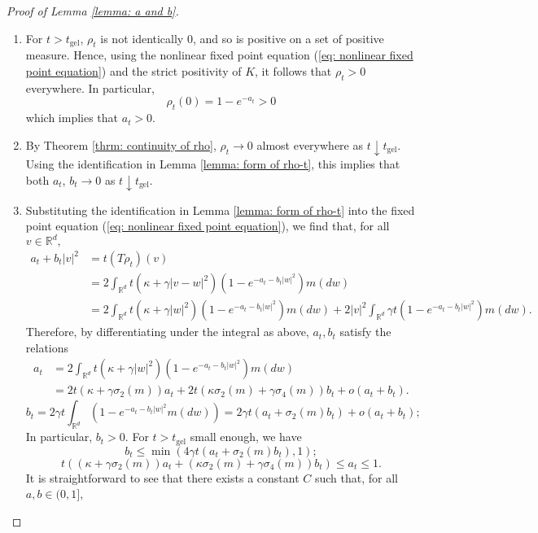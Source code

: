 \begin{proof}[Proof of Lemma \ref{lemma: a and b}] \begin{enumerate}[label=\roman{*}).]
    \item For $t>t_\text{gel}$, $\rho_t$ is not identically $0$, and so is positive on a set of positive measure. Hence, using the nonlinear fixed point equation (\ref{eq: nonlinear fixed point equation}) and the strict positivity of $K$, it follows that $\rho_t>0$ everywhere. In particular, \begin{equation}
        \rho_t(0)=1-e^{-a_t}>0
    \end{equation} which implies that $a_t>0.$
    \item By Theorem \ref{thrm: continuity of rho},  $\rho_t\rightarrow 0$ almost everywhere as $t\downarrow t_\text{gel}$. Using the identification in Lemma \ref{lemma: form of rho-t}, this implies that both $a_t$, $b_t \rightarrow 0$ as $t\downarrow t_\text{gel}$.
    \item Substituting the identification in Lemma \ref{lemma: form of rho-t} into the fixed point equation (\ref{eq: nonlinear fixed point equation}), we find that, for all $v\in \mathbb{R}^d,$ \begin{equation}\begin{split} a_t+b_t|v|^2 &= t(T\rho_t)(v)\\ & =2\int_{\mathbb{R}^d}t(\kappa+\gamma|v-w|^2)\left(1-e^{-a_t-b_t|w|^2}\right)m(dw) \\ & = 2\int_{\mathbb{R}^d} t(\kappa+\gamma|w|^2)\left(1-e^{-a_t-b_t|w|^2}\right)m(dw)+2|v|^2\int_{\mathbb{R}^d}\gamma t \left(1-e^{-a_t-b_t|w|^2}\right)m(dw). \end{split} \end{equation} Therefore, by differentiating under the integral as above, $a_t, b_t$ satisfy the relations \begin{equation} \begin{split}
        a_t&=2\int_{\mathbb{R}^d} t(\kappa+\gamma|w|^2)\left(1-e^{-a_t-b_t|w|^2}\right)m(dw)\\[1ex]&=2t(\kappa+\gamma\sigma_2(m))a_t+2t(\kappa\sigma_2(m)+\gamma\sigma_4(m))b_t+o(a_t+b_t).
   \end{split} \end{equation}\begin{equation}
        b_t=2\gamma t\int_{\mathbb{R}^d}\left(1-e^{-a_t-b_t|w|^2}m(dw)\right)= 2\gamma t(a_t+\sigma_2(m) b_t)+o(a_t+b_t);
    \end{equation} In particular, $b_t>0$. For $t>t_\text{gel}$ small enough, we have \begin{equation} b_t\le \min\left(4\gamma t(a_t+\sigma_2(m)b_t),1\right);  \end{equation} \begin{equation}  t((\kappa+\gamma\sigma_2(m))a_t+(\kappa\sigma_2(m)+\gamma\sigma_4(m))b_t) \le a_t \le 1. \end{equation} It is straightforward to see that there exists a constant $C$ such that, for all $a, b \in (0,1]$, \begin{equation}

\end{equation}
\end{enumerate}
\end{proof}
